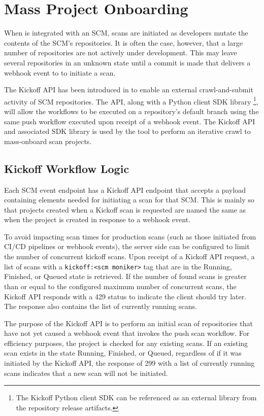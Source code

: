 \chapter{Mass Project Onboarding}\label{sec:kickoff}

When \cxoneflow is integrated with an SCM, scans are initiated as developers mutate
the contents of the SCM's repositories.  It is often the case, however, that a large
number of repositories are not actively under development.  This may leave several
repositories in an unknown state until a commit is made that delivers a webhook
event to \cxoneflow to initiate a scan.

The Kickoff API has been introduced in \cxoneflow to enable an external crawl-and-submit
activity of SCM repositories.  The API, along with a Python client SDK library
\footnote{The Kickoff Python client  SDK can be referenced as an external library from the \cxoneflow repository release artifacts.}, will allow
the \cxoneflow workflows to be executed on a repository's default branch using the same
push workflow executed upon receipt of a webhook event.  The Kickoff API and associated SDK library
is used by the \cxoneflowaudit tool to perform an iterative crawl to mass-onboard scan
projects.

\section{Kickoff Workflow Logic}

Each SCM event endpoint has a Kickoff API endpoint that accepts a payload containing
elements needed for initiating a scan for that SCM.  This is mainly so that projects
created when a Kickoff scan is requested are named the same as when the project
is created in response to a webhook event.

To avoid impacting scan times for production scans (such as those initiated from CI/CD
pipelines or webhook events), the server side can be configured to limit the number of
concurrent kickoff scans.  Upon receipt of a Kickoff API request, a list of scans
with a \texttt{kickoff:<scm moniker>} tag that are in the Running, Finished, or Queued
state is retrieved.  If the number of found scans is greater than or equal to the configured
maximum number of concurrent scans, the Kickoff API responds with a 429 status to indicate
the client should try later.  The response also contains the list of currently running scans.

The purpose of the Kickoff API is to perform an initial scan of repositories that have not
yet caused a webhook event that invokes the \cxoneflow push scan workflow.  For efficiency
purposes, the project is checked for any existing scans.  If an existing scan exists in the
state Running, Finished, or Queued, regardless of if it was initiated by the Kickoff API,
the response of 299 with a list of currently running scans indicates that a new scan will
not be initiated.

